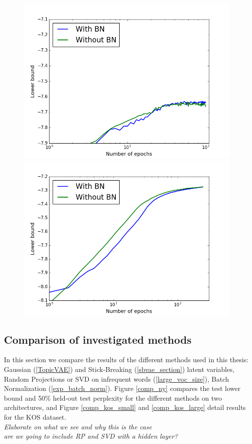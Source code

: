 \documentclass{report}
\begin{document}
	\begin{figure}\label{bn_kos}
		\includegraphics[scale = 0.4]{img/bn_kos.png}
		\includegraphics[scale = 0.4]{img/bn_ny.png}
	\end{figure}
	\subsection{Comparison of investigated methods}\label{comp_methods}
	In this section we compare the results of the different methods used in this thesis: Gaussian (\ref{TopicVAE}) and Stick-Breaking (\ref{sbvae_section}) latent variables, Random Projections or SVD on infrequent words (\ref{large_voc_size}), Batch Normalization (\ref{exp_batch_norm}). Figure \ref{comp_ny} compares the test lower bound and 50\% held-out test perplexity for the different methods on two architectures, and Figure \ref{comp_kos_small} and \ref{comp_kos_large} detail results for the KOS dataset. \\
	\textit{Elaborate on what we see and why this is the case}\\
	\textit{are we going to include RP and SVD with a hidden layer?}
	
\end{document}
